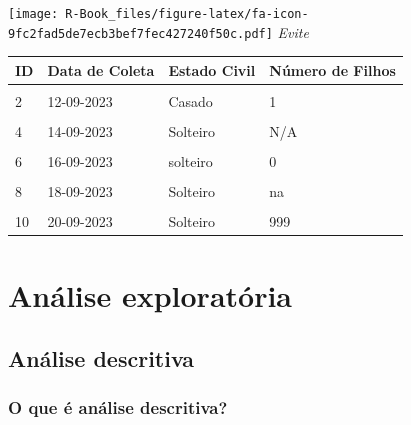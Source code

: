 \documentclass[
]{book}
\begin{document}
\texttt{[image: R-Book\_files/figure-latex/fa-icon-9fc2fad5de7ecb3bef7fec427240f50c.pdf]} \emph{Evite}

\begin{tabu} to 
\toprule
\textbf{ID} & \textbf{Data de Coleta} & \textbf{Estado Civil} & \textbf{Número de Filhos}\\
\midrule
{} &  &  & \\
2 & 12-09-2023 & Casado & 1\\
 &  &  & \\
4 & 14-09-2023 & Solteiro & N/A\\
 &  &  & \\
6 & 16-09-2023 & solteiro & 0\\
 &  &  & \\
8 & 18-09-2023 & Solteiro & na\\
 &  &  & \\
10 & 20-09-2023 & Solteiro & 999\\
\bottomrule
\end{tabu}

\hypertarget{analise-exploratoria}{%
\chapter{\texorpdfstring{\textbf{Análise exploratória}}{Análise exploratória}}\label{analise-exploratoria}}

\hypertarget{descritiva}{%
\section{Análise descritiva}\label{descritiva}}

\hypertarget{o-que-uxe9-anuxe1lise-descritiva}{%
\subsection{O que é análise descritiva?}\label{o-que-uxe9-anuxe1lise-descritiva}}
\end{document}
